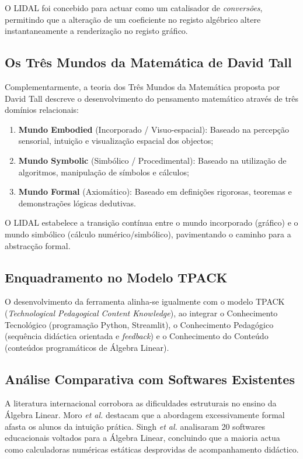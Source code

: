 \documentclass[conference]{IEEEtran}
\begin{document}
O LIDAL foi concebido para actuar como um catalisador de \textit{conversões}, permitindo que a alteração de um coeficiente no registo algébrico altere instantaneamente a renderização no registo gráfico.

\subsection{Os Três Mundos da Matemática de David Tall}

Complementarmente, a teoria dos Três Mundos da Matemática proposta por David Tall \cite{tall2004} descreve o desenvolvimento do pensamento matemático através de três domínios relacionais:

\begin{enumerate}
  \item \textbf{Mundo Embodied} (Incorporado / Visuo-espacial): Baseado na percepção sensorial, intuição e visualização espacial dos objectos;
  \item \textbf{Mundo Symbolic} (Simbólico / Procedimental): Baseado na utilização de algoritmos, manipulação de símbolos e cálculos;
  \item \textbf{Mundo Formal} (Axiomático): Baseado em definições rigorosas, teoremas e demonstrações lógicas dedutivas.
\end{enumerate}

O LIDAL estabelece a transição contínua entre o mundo incorporado (gráfico) e o mundo simbólico (cálculo numérico/simbólico), pavimentando o caminho para a abstracção formal.

\subsection{Enquadramento no Modelo TPACK}

O desenvolvimento da ferramenta alinha-se igualmente com o modelo TPACK (\textit{Technological Pedagogical Content Knowledge}), ao integrar o Conhecimento Tecnológico (programação Python, Streamlit), o Conhecimento Pedagógico (sequência didáctica orientada e \textit{feedback}) e o Conhecimento do Conteúdo (conteúdos programáticos de Álgebra Linear).

\subsection{Análise Comparativa com Softwares Existentes}

A literatura internacional corrobora as dificuldades estruturais no ensino da Álgebra Linear. Moro \textit{et al.} \cite{moro2016} destacam que a abordagem excessivamente formal afasta os alunos da intuição prática. Singh \textit{et al.} \cite{singh2021} analisaram 20 softwares educacionais voltados para a Álgebra Linear, concluindo que a maioria actua como calculadoras numéricas estáticas desprovidas de acompanhamento didáctico.
\end{document}
